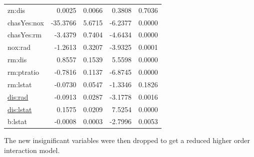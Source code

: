 \documentclass[
]{article}
\begin{document}
\begin{longtable}[]{@{}lrrrr@{}}
zn:dis & 0.0025 & 0.0066 & 0.3808 & 0.7036 \\
chasYes:nox & -35.3766 & 5.6715 & -6.2377 & 0.0000 \\
chasYes:rm & -3.4379 & 0.7404 & -4.6434 & 0.0000 \\
nox:rad & -1.2613 & 0.3207 & -3.9325 & 0.0001 \\
rm:dis & 0.8557 & 0.1539 & 5.5598 & 0.0000 \\
rm:ptratio & -0.7816 & 0.1137 & -6.8745 & 0.0000 \\
rm:lstat & -0.0730 & 0.0547 & -1.3346 & 0.1826 \\
\url{dis:rad} & -0.0913 & 0.0287 & -3.1778 & 0.0016 \\
\url{dis:lstat} & 0.1575 & 0.0209 & 7.5254 & 0.0000 \\
b:lstat & -0.0008 & 0.0003 & -2.7996 & 0.0053 \\
\end{longtable}

The new insignificant variables were then dropped to get a reduced
higher order interaction model.
\end{document}
